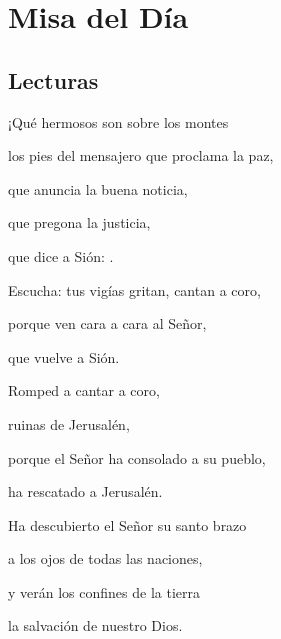 \chapter{Misa del Día}

	\section{Lecturas}


		 
		
		
			\begin{scripture}
				\begin{readprose}
					¡Qué hermosos son sobre los montes
					
					los pies del mensajero que proclama la paz,
					
					que anuncia la buena noticia,
					
					que pregona la justicia,
					
					que dice a Sión: .
					
					Escucha: tus vigías gritan, cantan a coro,
					
					porque ven cara a cara al Señor,
					
					que vuelve a Sión.
					
					Romped a cantar a coro,
					
					ruinas de Jerusalén,
					
					porque el Señor ha consolado a su pueblo,
					
					ha rescatado a Jerusalén.
					
					Ha descubierto el Señor su santo brazo
					
					a los ojos de todas las naciones,
					
					y verán los confines de la tierra
					
					la salvación de nuestro Dios.
				\end{readprose}
			\end{scripture}
	
		
		 
		
		
